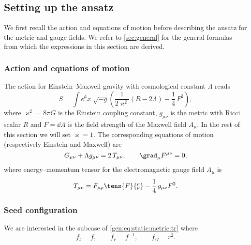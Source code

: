 \subsection{Setting up the ansatz}
\label{sec:derivation:ansatz}


We first recall the action and equations of motion before describing the ansatz for the metric and gauge fields.
We refer to \cref{sec:general} for the general formulas from which the expressions in this section are derived.


\subsubsection{Action and equations of motion}


The action for Einstein--Maxwell gravity with cosmological constant $\Lambda$ reads
\begin{equation}
	\label{deriv:eq:einstein-maxwell-action}
	S = \int \dd^4 x\; \sqrt{- g} \left( \frac{1}{2 \varkappa^2} (R - 2 \Lambda) - \frac{1}{4}\, F^2 \right),
\end{equation} 
where $\varkappa^2 = 8 \pi G$ is the Einstein coupling constant, $g_{\mu\nu}$ is the metric with Ricci scalar $R$ and $F = \dd A$ is the field strength of the Maxwell field $A_\mu$.
In the rest of this section we will set $\varkappa = 1$.
The corresponding equations of motion (respectively Einstein and Maxwell) are
\begin{equation}
	\label{deriv:eq:einstein-maxwell-eom}
	G_{\mu\nu} + \Lambda g_{\mu\nu} = 2\, T_{\mu\nu}, \qquad
	\grad_\mu F^{\mu\nu} = 0,
\end{equation} 
where energy--momentum tensor for the electromagnetic gauge field $A_\mu$ is
\begin{equation}
	T_{\mu\nu} = F_{\mu\rho} \tens{F}{_\nu^\rho} - \frac{1}{4}\, g_{\mu\nu} F^2.
\end{equation} 


\subsubsection{Seed configuration}


We are interested in the subcase of \eqref{gen:eq:static:metric:tr} where
\begin{equation}
	\label{eq:static-ansatz-one-unknown}
	f_t = f, \qquad
	f_r = f^{-1}, \qquad
	f_\Omega = r^2.
\end{equation} 

